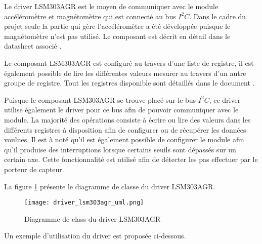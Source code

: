 Le driver LSM303AGR est le moyen de communiquer avec le module accéléromètre et magnétomètre qui est connecté au bus $I^{2}C$. Dans le cadre du projet seule la partie qui gère l'accéléromètre a été développée puisque le magnétomètre n'est pas utilisé. Le composant est décrit en détail dans le datasheet associé \cite{lsm303agr-datasheet}.

Le composant LSM303AGR est configuré au travers d'une liste de registre, il est également possible de lire les différentes valeurs mesurer au travers d'un autre groupe de registre. Tout les registres disponible sont détaillés dans le document \cite[p.~43]{lsm303agr-datasheet}.

Puisque le composant LSM303AGR se trouve placé sur le bus $I^{2}C$, ce driver utilise également le driver pour ce bus afin de pouvoir communiquer avec le module. La majorité des opérations consiste à écrire ou lire des valeurs dans les différents registres à disposition afin de configurer ou de récupérer les données voulues. Il est à noté qu'il est également possible de configurer le module afin qu'il produise des interruptions lorsque certains seuils sont dépassés sur un certain axe. Cette fonctionnalité est utilisé afin de détecter les pas effectuer par le porteur de capteur.


La figure \ref{fig:driver_lsm303agr_uml} présente le diagramme de classe du driver LSM303AGR.

\begin{figure}[htb]
\centering 
\texttt{[image: driver\_lsm303agr\_uml.png]} 
\caption{Diagramme de class du driver LSM303AGR}
\label{fig:driver_lsm303agr_uml}
\end{figure}

Un exemple d'utilisation du driver est proposée ci-dessous.

